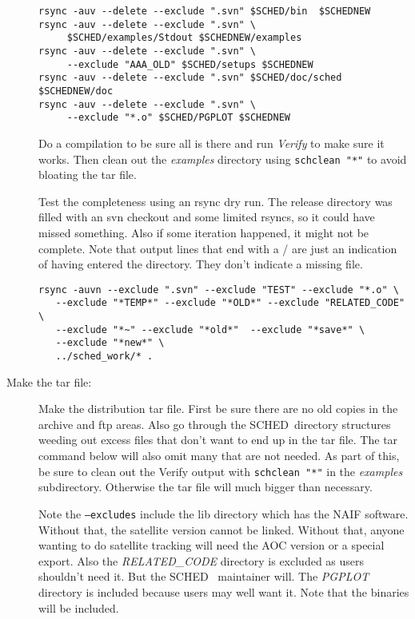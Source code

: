 \documentclass{report}
\newcommand{\schedb}{{\sc SCHED~}}
\begin{document}
\begin{description}
\begin{verbatim}
rsync -auv --delete --exclude ".svn" $SCHED/bin  $SCHEDNEW
rsync -auv --delete --exclude ".svn" \
     $SCHED/examples/Stdout $SCHEDNEW/examples
rsync -auv --delete --exclude ".svn" \
     --exclude "AAA_OLD" $SCHED/setups $SCHEDNEW
rsync -auv --delete --exclude ".svn" $SCHED/doc/sched $SCHEDNEW/doc
rsync -auv --delete --exclude ".svn" \
     --exclude "*.o" $SCHED/PGPLOT $SCHEDNEW
\end{verbatim}

Do a compilation to be sure all is there and run {\sl Verify} to make
sure it works.  Then clean out the {\sl examples} directory using
{\tt schclean "*"} to avoid bloating the tar file.

Test the completeness using an rsync dry run.  The release directory
was filled with an svn checkout and some limited rsyncs, so it could
have missed something.  Also if some iteration happened, it might not
be complete. Note that output lines that end with a / are just an
indication of having entered the directory.  They don't indicate a
missing file.

\begin{verbatim}
rsync -auvn --exclude ".svn" --exclude "TEST" --exclude "*.o" \
   --exclude "*TEMP*" --exclude "*OLD*" --exclude "RELATED_CODE" \
   --exclude "*~" --exclude "*old*"  --exclude "*save*" \
   --exclude "*new*" \
   ../sched_work/* .
\end{verbatim}


\item [Make the tar file:]

Make the distribution tar file.  First be sure there are no old copies
in the archive and ftp areas.  Also go through the \schedb directory
structures weeding out excess files that don't want to end up in the
tar file.  The tar command below will also omit many that are not
needed.  As part of this, be sure to clean out the Verify output
with {\tt schclean "*"} in the {\sl examples} subdirectory.  Otherwise
the tar file will much bigger than necessary.

Note the {\tt --excludes} include the lib directory which has the NAIF
software.  Without that, the satellite version cannot be linked.
Without that, anyone wanting to do satellite tracking will need the
AOC version or a special export.  Also the {\sl RELATED\_CODE}
directory is excluded as users shouldn't need it.  But the \schedb
maintainer will.  The {\sl PGPLOT} directory is included because users
may well want it.   Note that the binaries will be included.


\end{description}
\end{document}
